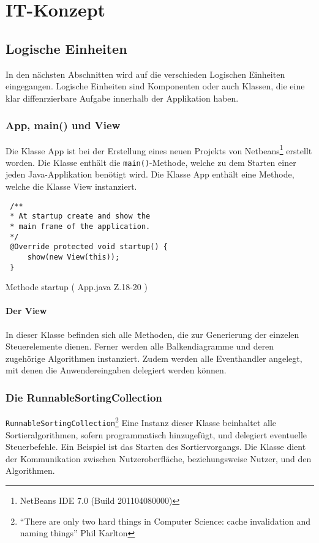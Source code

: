 \chapter{IT-Konzept}

\section{Logische Einheiten}

In den nächsten Abschnitten wird auf die verschieden Logischen Einheiten eingegangen. Logische Einheiten
sind Komponenten oder auch Klassen, die eine klar diffenrzierbare Aufgabe innerhalb der Applikation haben.

\subsection{App, main() und View}
Die Klasse App ist bei der Erstellung eines neuen
Projekts von Netbeans\footnote{NetBeans IDE 7.0 (Build 201104080000)} erstellt worden.
Die Klasse enthält die \texttt{main()}-Methode, welche zu dem Starten einer jeden Java-Applikation benötigt wird.
Die Klasse App enthält eine Methode, welche die Klasse View instanziert.

\begin{listing}[H]
    \begin{verbatim}
 /**
 * At startup create and show the 
 * main frame of the application.
 */
 @Override protected void startup() {
     show(new View(this));
 }    
    \end{verbatim}
    \caption{Methode startup ( App.java Z.18-20 )}
    \label{code:app:startup}
\end{listing}

\subsubsection{Der View}
In dieser Klasse befinden sich alle Methoden, die zur Generierung der einzelen Steuerelemente dienen.
Ferner werden alle Balkendiagramme und deren zugehörige Algorithmen instanziert. Zudem werden alle Eventhandler angelegt,
mit denen die Anwendereingaben delegiert werden können.

\subsection{Die RunnableSortingCollection}
\texttt{RunnableSortingCollection}\footnote{"`There are only two hard things in Computer Science: cache invalidation and naming things"' \newline Phil Karlton} 
Eine Instanz dieser Klasse beinhaltet alle Sortieralgorithmen, sofern programmatisch hinzugefügt, und delegiert
eventuelle Steuerbefehle. Ein Beispiel ist das Starten des Sortiervorgangs. Die Klasse dient der 
Kommunikation zwischen Nutzeroberfläche, beziehungsweise Nutzer, und den Algorithmen.


